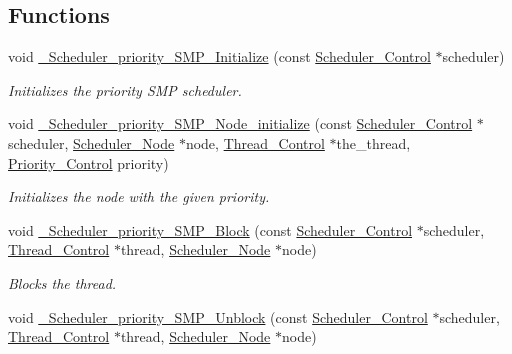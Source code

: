 \subsection*{Functions}
\begin{DoxyCompactItemize}
\item 
void \mbox{\hyperlink{group__RTEMSScoreSchedulerPrioritySMP_gaa39c3fcde95b18282122694e5a103481}{\+\_\+\+Scheduler\+\_\+priority\+\_\+\+S\+M\+P\+\_\+\+Initialize}} (const \mbox{\hyperlink{struct__Scheduler__Control}{Scheduler\+\_\+\+Control}} $\ast$scheduler)
\begin{DoxyCompactList}\small\item\em Initializes the priority S\+MP scheduler. \end{DoxyCompactList}\item 
void \mbox{\hyperlink{group__RTEMSScoreSchedulerPrioritySMP_gad200cc6ab0d0f7aef63caf41931b7e59}{\+\_\+\+Scheduler\+\_\+priority\+\_\+\+S\+M\+P\+\_\+\+Node\+\_\+initialize}} (const \mbox{\hyperlink{struct__Scheduler__Control}{Scheduler\+\_\+\+Control}} $\ast$scheduler, \mbox{\hyperlink{structScheduler__Node}{Scheduler\+\_\+\+Node}} $\ast$node, \mbox{\hyperlink{struct__Thread__Control}{Thread\+\_\+\+Control}} $\ast$the\+\_\+thread, \mbox{\hyperlink{group__RTEMSScorePriority_ga59d02b58072d31a9a1cfe644557aefe2}{Priority\+\_\+\+Control}} priority)
\begin{DoxyCompactList}\small\item\em Initializes the node with the given priority. \end{DoxyCompactList}\item 
void \mbox{\hyperlink{group__RTEMSScoreSchedulerPrioritySMP_gac318ac35c1c7ce20902eeea8953fa3d1}{\+\_\+\+Scheduler\+\_\+priority\+\_\+\+S\+M\+P\+\_\+\+Block}} (const \mbox{\hyperlink{struct__Scheduler__Control}{Scheduler\+\_\+\+Control}} $\ast$scheduler, \mbox{\hyperlink{struct__Thread__Control}{Thread\+\_\+\+Control}} $\ast$thread, \mbox{\hyperlink{structScheduler__Node}{Scheduler\+\_\+\+Node}} $\ast$node)
\begin{DoxyCompactList}\small\item\em Blocks the thread. \end{DoxyCompactList}\item 
void \mbox{\hyperlink{group__RTEMSScoreSchedulerPrioritySMP_ga03146f8672985f28bf7f4d2d73c90691}{\+\_\+\+Scheduler\+\_\+priority\+\_\+\+S\+M\+P\+\_\+\+Unblock}} (const \mbox{\hyperlink{struct__Scheduler__Control}{Scheduler\+\_\+\+Control}} $\ast$scheduler, \mbox{\hyperlink{struct__Thread__Control}{Thread\+\_\+\+Control}} $\ast$thread, \mbox{\hyperlink{structScheduler__Node}{Scheduler\+\_\+\+Node}} $\ast$node)

\end{DoxyCompactItemize}

